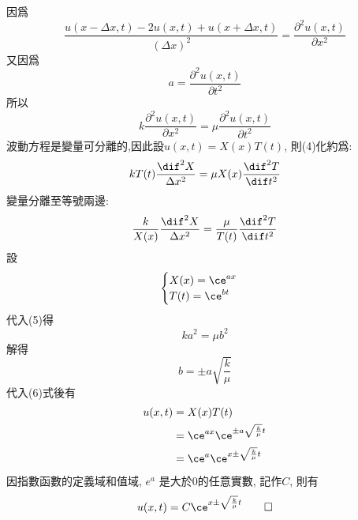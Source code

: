 \begin{solve}
    因爲
    $$\frac{u(x - \Delta x, t) - 2u(x, t) + u(x + \Delta x, t)}{(\Delta x)^2} = \dfrac{\partial^2 u(x,t)}{\partial x^2}$$
    又因爲
    $$a = \frac{\partial^2 u(x,t)}{\partial t^2}$$
    所以
    \begin{equation}
        k \dfrac{\partial^2 u(x,t)}{\partial x^2} = \mu \frac{\partial^2 u(x,t)}{\partial t^2}
    \end{equation}
    波動方程是變量可分離的,因此設$u(x,t) = X(x)T(t)$, 則(4)化約爲:
    \begin{equation*}
        kT(t) \frac{\dif^2 X}{\Delta x^2} = \mu X(x)\frac{\dif^2 T}{\dif t^2}
    \end{equation*}
    變量分離至等號兩邊:
    \begin{equation}
        \frac{k}{X(x)}\frac{\dif^2 X}{\Delta x^2} = \frac{\mu}{T(t)}\frac{\dif^2 T}{\dif t^2}
    \end{equation}
    設
    \begin{equation}
        \begin{cases}
            X(x) = \ce^{ax} \\
            T(t) = \ce^{bt}
        \end{cases}
    \end{equation}
    代入(5)得
    $$ka^2 = \mu b^2$$
    解得
    $$b = \pm a\sqrt{\frac{k}{\mu}}$$
    代入(6)式後有
    \begin{align}
        u(x,t) & = X(x)T(t)                                 \\
               & = \ce^{ax}\ce^{\pm a\sqrt{\frac{k}{\mu}}t} \\
               & = \ce^a \ce^{x \pm \sqrt{\frac{k}{\mu}}t}
    \end{align}
    因指數函數的定義域和值域, $e^a$ 是大於$0$的任意實數, 記作$C$, 則有
    \begin{equation*}
        u(x,t) = C\ce^{x \pm \sqrt{\frac{k}{\mu}}t} \qedhere
    \end{equation*}


\end{solve}